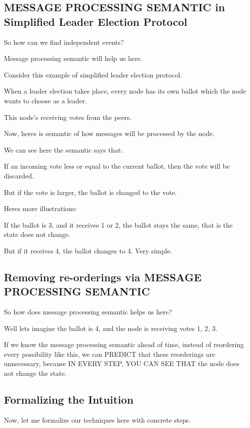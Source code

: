 \subsection{MESSAGE PROCESSING SEMANTIC in Simplified Leader Election Protocol}

So how can we find independent events? 

Message processing semantic will help us here.

Consider this example of simplified leader election protocol.

When a leader election takes place, every node has its own ballot which the node
wants to choose as a leader. 

This node's receiving votes from the peers.

Now, heres is semantic of how messages will be processed by the node.

We can see here the semantic says that: 

If an incoming vote less or equal to the current ballot, then the vote will be
discarded. 

But if the vote is larger, the ballot is changed to the vote.

Heres more illustrations:

If the ballot is 3, and it receives 1 or 2, the ballot stays the same, that is the
state does not change.

But if it receives 4, the ballot changes to 4. Very simple.

\subsection{Removing re-orderings via MESSAGE PROCESSING SEMANTIC}

So how does message processing semantic helps us here?

Well lets imagine the ballot is 4, and the node is receiving votes 1, 2, 3.

If we know the message processing semantic ahead of time, instead of reordering
every possibility like this, we can PREDICT that these reorderings are
unnecessary, because IN EVERY STEP, YOU CAN SEE THAT the node does not change
the state.

\subsection{Formalizing the Intuition}

Now, let me formalize our techniques here with concrete steps.

